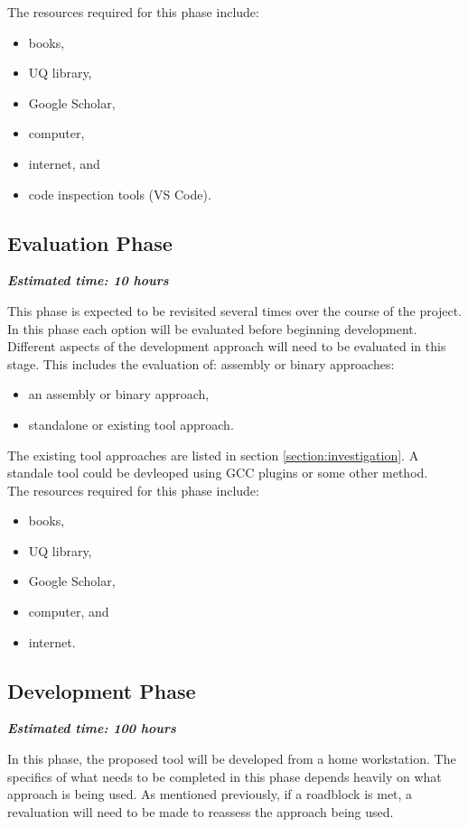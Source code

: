 \documentclass[twocolumn]{article}
\begin{document}
The resources required for this phase include:
\begin{itemize}
    \item books,
    \item UQ library,
    \item Google Scholar,
    \item computer,
    \item internet, and
    \item code inspection tools (VS Code).
\end{itemize}

\subsection{Evaluation Phase}
\textbf{\textit{Estimated time: 10 hours}}

This phase is expected to be revisited several times over the course of the project. In this phase each option will be evaluated before beginning development. Different aspects of the development approach will need to be evaluated in this stage. This includes the evaluation of: assembly or binary approaches:

\begin{itemize}
    \item an assembly or binary approach,
    \item standalone or existing tool approach. 
\end{itemize}

The existing tool approaches are listed in section \ref{section:investigation}. A standale tool could be devleoped using GCC plugins or some other method.\\

The resources required for this phase include:
\begin{itemize}
    \item books,
    \item UQ library,
    \item Google Scholar,
    \item computer, and
    \item internet.
\end{itemize}

\subsection{Development Phase}
\textbf{\textit{Estimated time: 100 hours}}

In this phase, the proposed tool will be developed from a home workstation. 
The specifics of what needs to be completed in this phase depends heavily on what approach is being used. As mentioned previously, if a roadblock is met, a revaluation will need to be made to reassess the approach being used. \\
\end{document}
